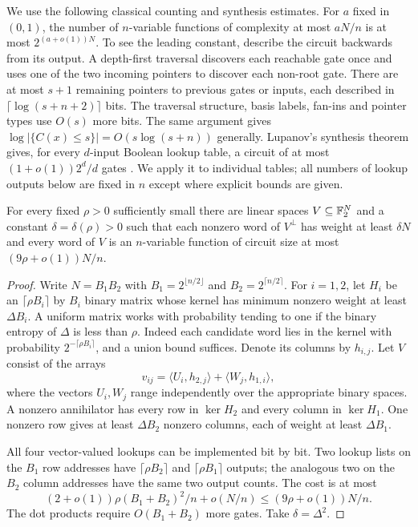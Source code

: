 \documentclass[11pt]{article}
\begin{document}
We use the following classical counting and synthesis estimates. For $a$ fixed in $(0,1)$, the number of $n$-variable functions of complexity at most $aN/n$ is at most $2^{(a+o(1))N}$. To see the leading constant, describe the circuit backwards from its output. A depth-first traversal discovers each reachable gate once and uses one of the two incoming pointers to discover each non-root gate. There are at most $s+1$ remaining pointers to previous gates or inputs, each described in $\lceil\log(s+n+2)\rceil$ bits. The traversal structure, basis labels, fan-ins and pointer types use $O(s)$ more bits. The same argument gives $\log|\{C(x)\le s\}|=O(s\log(s+n))$ generally. Lupanov's synthesis theorem gives, for every $d$-input Boolean lookup table, a circuit of at most $(1+o(1))2^d/d$ gates \cite{lup}. We apply it to individual tables; all numbers of lookup outputs below are fixed in $n$ except where explicit bounds are given.

\begin{lemma}\label{l:prod}
For every fixed $\rho>0$ sufficiently small there are linear spaces $V\subseteq\mathbb F_2^N$ and a constant $\delta=\delta(\rho)>0$ such that each nonzero word of $V^\perp$ has weight at least $\delta N$ and every word of $V$ is an $n$-variable function of circuit size at most $(9\rho+o(1))N/n$.
\end{lemma}
\begin{proof}
Write $N=B_1 B_2$ with $B_1=2^{\lfloor n/2\rfloor}$ and $B_2=2^{\lceil n/2\rceil}$. For $i=1,2$, let $H_i$ be an $\lceil\rho B_i\rceil$ by $B_i$ binary matrix whose kernel has minimum nonzero weight at least $\Delta B_i$. A uniform matrix works with probability tending to one if the binary entropy of $\Delta$ is less than $\rho$. Indeed each candidate word lies in the kernel with probability $2^{-\lceil\rho B_i\rceil}$, and a union bound suffices. Denote its columns by $h_{i,j}$. Let $V$ consist of the arrays
\[
 v_{ij}=\langle U_i,h_{2,j}\rangle+\langle W_j,h_{1,i}\rangle,
\]
where the vectors $U_i,W_j$ range independently over the appropriate binary spaces. A nonzero annihilator has every row in $\ker H_2$ and every column in $\ker H_1$. One nonzero row gives at least $\Delta B_2$ nonzero columns, each of weight at least $\Delta B_1$.

All four vector-valued lookups can be implemented bit by bit. Two lookup lists on the $B_1$ row addresses have $\lceil\rho B_2\rceil$ and $\lceil\rho B_1\rceil$ outputs; the analogous two on the $B_2$ column addresses have the same two output counts. The cost is at most
\[
 (2+o(1))\rho(B_1+B_2)^2/n +o(N/n)
 \le(9\rho+o(1))N/n.
\]
The dot products require $O(B_1+B_2)$ more gates. Take $\delta=\Delta^2$.
\end{proof}
\end{document}

